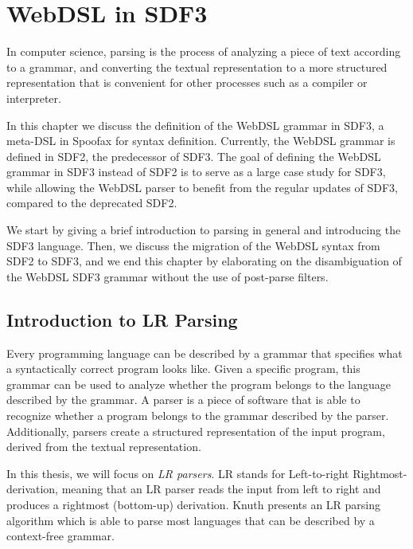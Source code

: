 
\chapter{\label{chap:sdf3}WebDSL in SDF3}

  In computer science, parsing is the process of analyzing a piece of text according to a grammar, and converting the textual representation to a more structured representation that is convenient for other processes such as a compiler or interpreter.

  In this chapter we discuss the definition of the WebDSL grammar in SDF3, a meta-DSL in Spoofax for syntax definition. Currently, the WebDSL grammar is defined in SDF2, the predecessor of SDF3. The goal of defining the WebDSL grammar in SDF3 instead of SDF2 is to serve as a large case study for SDF3, while allowing the WebDSL parser to benefit from the regular updates of SDF3, compared to the deprecated SDF2.

  We start by giving a brief introduction to parsing in general and introducing the SDF3 language. Then, we discuss the migration of the WebDSL syntax from SDF2 to SDF3, and we end this chapter by elaborating on the disambiguation of the WebDSL SDF3 grammar without the use of post-parse filters.

  \section{\label{sec:parsing}Introduction to LR Parsing}

    Every programming language can be described by a grammar that specifies what a syntactically correct program looks like. Given a specific program, this grammar can be used to analyze whether the program belongs to the language described by the grammar. A parser is a piece of software that is able to recognize whether a program belongs to the grammar described by the parser. Additionally, parsers create a structured representation of the input program, derived from the textual representation.
    
    In this thesis, we will focus on \textit{LR parsers}. LR stands for Left-to-right Rightmost-derivation, meaning that an LR parser reads the input from left to right and produces a rightmost (bottom-up) derivation. Knuth \citeyear{knuth1965translation} presents an LR parsing algorithm which is able to parse most languages that can be described by a context-free grammar.

